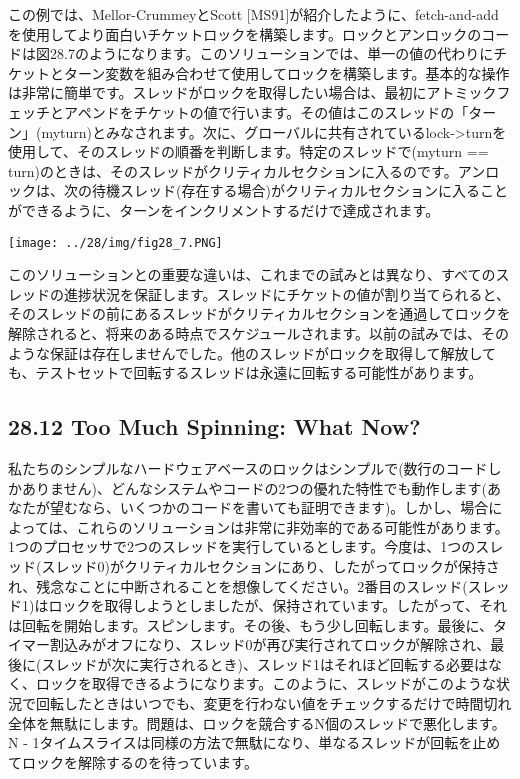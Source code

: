 この例では、Mellor-CrummeyとScott
{[}MS91{]}が紹介したように、fetch-and-addを使用してより面白いチケットロックを構築します。ロックとアンロックのコードは図28.7のようになります。このソリューションでは、単一の値の代わりにチケットとターン変数を組み合わせて使用してロックを構築します。基本的な操作は非常に簡単です。スレッドがロックを取得したい場合は、最初にアトミックフェッチとアペンドをチケットの値で行います。その値はこのスレッドの「ターン」(myturn)とみなされます。次に、グローバルに共有されているlock-\textgreater turnを使用して、そのスレッドの順番を判断します。特定のスレッドで(myturn
==
turn)のときは、そのスレッドがクリティカルセクションに入るのです。アンロックは、次の待機スレッド(存在する場合)がクリティカルセクションに入ることができるように、ターンをインクリメントするだけで達成されます。

\texttt{[image: ../28/img/fig28\_7.PNG]}

このソリューションとの重要な違いは、これまでの試みとは異なり、すべてのスレッドの進捗状況を保証します。スレッドにチケットの値が割り当てられると、そのスレッドの前にあるスレッドがクリティカルセクションを通過してロックを解除されると、将来のある時点でスケジュールされます。以前の試みでは、そのような保証は存在しませんでした。他のスレッドがロックを取得して解放しても、テストセットで回転するスレッドは永遠に回転する可能性があります。

\hypertarget{too-much-spinning-what-now}{%
\subsection*{28.12 Too Much Spinning: What
Now?}\label{too-much-spinning-what-now}}

私たちのシンプルなハードウェアベースのロックはシンプルで(数行のコードしかありません)、どんなシステムやコードの2つの優れた特性でも動作します(あなたが望むなら、いくつかのコードを書いても証明できます)。しかし、場合によっては、これらのソリューションは非常に非効率的である可能性があります。1つのプロセッサで2つのスレッドを実行しているとします。今度は、1つのスレッド(スレッド0)がクリティカルセクションにあり、したがってロックが保持され、残念なことに中断されることを想像してください。2番目のスレッド(スレッド1)はロックを取得しようとしましたが、保持されています。したがって、それは回転を開始します。スピンします。その後、もう少し回転します。最後に、タイマー割込みがオフになり、スレッド0が再び実行されてロックが解除され、最後に(スレッドが次に実行されるとき)、スレッド1はそれほど回転する必要はなく、ロックを取得できるようになります。このように、スレッドがこのような状況で回転したときはいつでも、変更を行わない値をチェックするだけで時間切れ全体を無駄にします。問題は、ロックを競合するN個のスレッドで悪化します。N
-
1タイムスライスは同様の方法で無駄になり、単なるスレッドが回転を止めてロックを解除するのを待っています。


